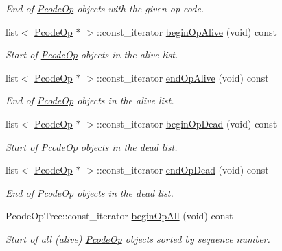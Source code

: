 \begin{DoxyCompactItemize}
\begin{DoxyCompactList}\small\item\em End of \mbox{\hyperlink{class_pcode_op}{Pcode\+Op}} objects with the given op-\/code. \end{DoxyCompactList}\item 
list$<$ \mbox{\hyperlink{class_pcode_op}{Pcode\+Op}} $\ast$ $>$\+::const\+\_\+iterator \mbox{\hyperlink{class_funcdata_ae1a4f058ff4886d7ae4ceb8160c6f3e0}{begin\+Op\+Alive}} (void) const
\begin{DoxyCompactList}\small\item\em Start of \mbox{\hyperlink{class_pcode_op}{Pcode\+Op}} objects in the {\itshape alive} list. \end{DoxyCompactList}\item 
list$<$ \mbox{\hyperlink{class_pcode_op}{Pcode\+Op}} $\ast$ $>$\+::const\+\_\+iterator \mbox{\hyperlink{class_funcdata_a01a64130db5cbaaa972eed4509933870}{end\+Op\+Alive}} (void) const
\begin{DoxyCompactList}\small\item\em End of \mbox{\hyperlink{class_pcode_op}{Pcode\+Op}} objects in the {\itshape alive} list. \end{DoxyCompactList}\item 
list$<$ \mbox{\hyperlink{class_pcode_op}{Pcode\+Op}} $\ast$ $>$\+::const\+\_\+iterator \mbox{\hyperlink{class_funcdata_a2f98b1b212ede713c3fe936bc2c7e2ea}{begin\+Op\+Dead}} (void) const
\begin{DoxyCompactList}\small\item\em Start of \mbox{\hyperlink{class_pcode_op}{Pcode\+Op}} objects in the {\itshape dead} list. \end{DoxyCompactList}\item 
list$<$ \mbox{\hyperlink{class_pcode_op}{Pcode\+Op}} $\ast$ $>$\+::const\+\_\+iterator \mbox{\hyperlink{class_funcdata_a5974d38341f528cce4878658d11b4d0f}{end\+Op\+Dead}} (void) const
\begin{DoxyCompactList}\small\item\em End of \mbox{\hyperlink{class_pcode_op}{Pcode\+Op}} objects in the {\itshape dead} list. \end{DoxyCompactList}\item 
Pcode\+Op\+Tree\+::const\+\_\+iterator \mbox{\hyperlink{class_funcdata_a1bbd4329856ff0c1ae80672dfbc79d83}{begin\+Op\+All}} (void) const
\begin{DoxyCompactList}\small\item\em Start of all (alive) \mbox{\hyperlink{class_pcode_op}{Pcode\+Op}} objects sorted by sequence number. \end{DoxyCompactList}\item 

\end{DoxyCompactItemize}
